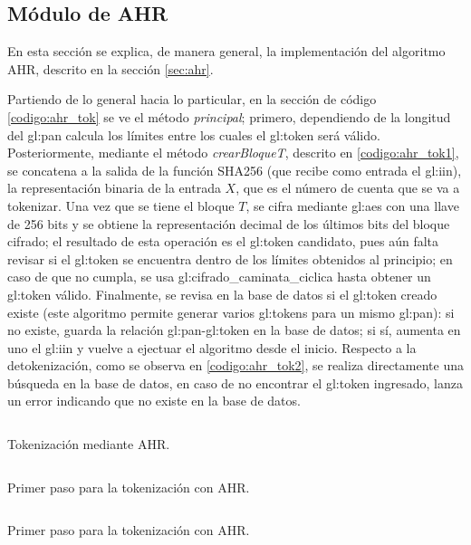 %
%
%

\subsection{Módulo de AHR}
En esta sección se explica, de manera general, la implementación del algoritmo
AHR, descrito en la sección \ref{sec:ahr}.

Partiendo de lo general hacia lo particular, en la sección de código
\ref{codigo:ahr_tok} se ve el método \textit{principal}; primero, dependiendo de
la longitud del \gls{gl:pan} calcula los límites entre los cuales el
\gls{gl:token} será válido. Posteriormente, mediante el método
\textit{crearBloqueT}, descrito en \ref{codigo:ahr_tok1}, se concatena a la
salida de la función SHA256 (que recibe como entrada el \gls{gl:iin}), la
representación binaria de la entrada $X$, que es el número de cuenta que se
va a tokenizar. Una vez que se tiene el bloque $T$, se cifra mediante
\gls{gl:aes} con una llave de 256 bits y se obtiene la representación decimal
de los últimos bits del bloque cifrado; el resultado de esta operación es
el \gls{gl:token} candidato, pues aún falta revisar si el \gls{gl:token} se
encuentra dentro de los límites obtenidos al principio; en caso de que no
cumpla, se usa \gls{gl:cifrado_caminata_ciclica} hasta obtener un \gls{gl:token}
válido. Finalmente, se revisa en la base de datos si el \gls{gl:token} creado
existe (este algoritmo permite generar varios \glspl{gl:token} para un mismo
\gls{gl:pan}): si no existe, guarda la relación \gls{gl:pan}-\gls{gl:token} en
la base de datos; si sí, aumenta en uno el \gls{gl:iin} y vuelve a ejectuar
el algoritmo desde el inicio. Respecto a la detokenización, como se observa en
\ref{codigo:ahr_tok2}, se realiza directamente una búsqueda en la base de datos,
en caso de no encontrar el \gls{gl:token} ingresado, lanza un error indicando
que no existe en la base de datos.

\begin{listing}
  \inputminted[firstline=284, lastline=328]
    {c++}{../implementaciones/ahr/ahr.cpp}
  \caption{Tokenización mediante AHR.}
  \label{codigo:ahr_tok}
\end{listing}

\begin{listing}
  \inputminted[firstline=193, lastline=223]
    {c++}{../implementaciones/ahr/ahr.cpp}
  \caption{Primer paso para la tokenización con AHR.}
  \label{codigo:ahr_tok1}
\end{listing}

\begin{listing}
  \inputminted[firstline=360, lastline=372]
    {c++}{../implementaciones/ahr/ahr.cpp}
  \caption{Primer paso para la tokenización con AHR.}
  \label{codigo:ahr_tok2}
\end{listing}
